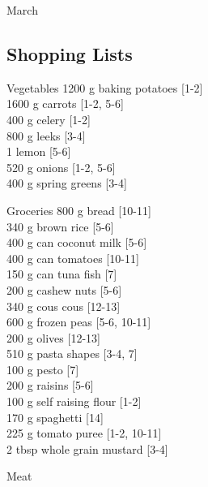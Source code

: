 \begin{menu}{March}
    \subsection*{Shopping Lists}
      \begin{shoppinglist}{Vegetables}
      1200 g baking potatoes {\scriptsize[1-2]}\\
      1600 g carrots {\scriptsize[1-2, 5-6]}\\
      400 g celery {\scriptsize[1-2]}\\
      800 g leeks {\scriptsize[3-4]}\\
      1  lemon {\scriptsize[5-6]}\\
      520 g onions {\scriptsize[1-2, 5-6]}\\
      400 g spring greens {\scriptsize[3-4]}\\
      \end{shoppinglist}%
      \begin{shoppinglist}{Groceries}
      800 g bread {\scriptsize[10-11]}\\
      340 g brown rice {\scriptsize[5-6]}\\
      400 g can coconut milk {\scriptsize[5-6]}\\
      400 g can tomatoes {\scriptsize[10-11]}\\
      150 g can tuna fish {\scriptsize[7]}\\
      200 g cashew nuts {\scriptsize[5-6]}\\
      340 g cous cous {\scriptsize[12-13]}\\
      600 g frozen peas {\scriptsize[5-6, 10-11]}\\
      200 g olives {\scriptsize[12-13]}\\
      510 g pasta shapes {\scriptsize[3-4, 7]}\\
      100 g pesto {\scriptsize[7]}\\
      200 g raisins {\scriptsize[5-6]}\\
      100 g self raising flour {\scriptsize[1-2]}\\
      170 g spaghetti {\scriptsize[14]}\\
      225 g tomato puree {\scriptsize[1-2, 10-11]}\\
      2 tbsp whole grain mustard {\scriptsize[3-4]}\\
      \end{shoppinglist}%
      \par\vfil %
      \begin{shoppinglist}{Meat}

\end{shoppinglist}
\end{menu}
